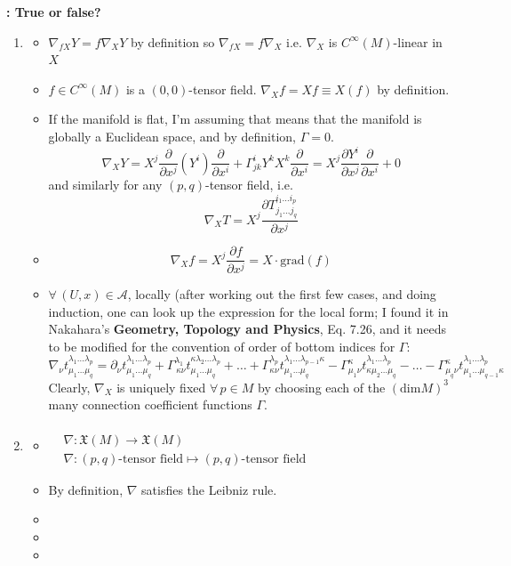 	\textbf{: True or false?}
	
	\begin{enumerate}
		\item[(a)] 
		\begin{itemize}
			\item $\nabla_{fX}Y = f\nabla_XY$ by definition so $\nabla_{fX} = f\nabla_X$ i.e. $\nabla_X$ is $C^{\infty}(M)$-linear in $X$
			\item $f\in C^{\infty}(M)$ is a $(0,0)$-tensor field. $\nabla_Xf = Xf \equiv X(f)$ by definition.
			\item If the manifold is flat, I'm assuming that means that the manifold is globally a Euclidean space, and by definition, $\Gamma=0$.
			\[
			\nabla_X Y = X^j \frac{ \partial }{ \partial x^j} (Y^i) \frac{ \partial }{ \partial x^i } + \Gamma^i_{jk} Y^k X^k \frac{ \partial }{ \partial x^i} = X^j \frac{ \partial Y^i}{ \partial x^j} \frac{ \partial }{ \partial x^i} + 0
			\]
			and similarly for any $(p,q)$-tensor field, i.e.
			\[
			\nabla_X T = X^j \frac{ \partial T^{i_1 \dots i_p}_{ j_1 \dots j_q} }{ \partial x^j}
			\]
			\item \[
			\nabla_X f = X^j \frac{ \partial f}{ \partial x^j} = X\cdot \text{grad}(f)
			\]
			\item $\forall \, (U,x) \in \mathcal{A}$, locally (after working out the first few cases, and doing induction, one can look up the expression for the local form; I found it in Nakahara's \textbf{Geometry, Topology and Physics}, Eq. 7.26, and it needs to be modified for the convention of order of bottom indices for $\Gamma$:
			\[
			\nabla_{\nu} t^{\lambda_1 \dots \lambda_p }_{ \mu_1 \dots \mu_q} = \partial_{\nu} t^{\lambda_1 \dots \lambda_p}_{ \mu_1 \dots \mu_q} + \Gamma^{\lambda_1}_{ \,  \kappa \nu } t^{\kappa \lambda_2 \dots \lambda_p }_{\mu_1 \dots \mu_q} + \dots + \Gamma^{\lambda_p}_{ \kappa \nu } t^{\lambda_1 \dots \lambda_{p-1} \kappa }_{ \mu_1 \dots \mu_q} - \Gamma^{\kappa}_{  \mu_1 \nu} t^{\lambda_1 \dots \lambda_p }_{ \kappa \mu_2 \dots \mu_q} - \dots - \Gamma^{\kappa}_{  \mu_q \nu} t^{\lambda_1 \dots \lambda_p }_{\mu_1 \dots \mu_{q-1} \kappa }
			\]
			Clearly, $\nabla_X$ is uniquely fixed $\forall \, p \in M$ by choosing each of the $(\text{dim}M)^3$ many connection coefficient functions $\Gamma$. 
		\end{itemize}
		\item[(b)] 
		\begin{itemize}
			\item $\begin{aligned} & \quad \\ & \nabla: \mathfrak{X}(M) \to \mathfrak{X}(M) \\
			& \nabla : (p,q)\text{-tensor field} \mapsto (p,q)\text{-tensor field} \end{aligned}$
			\item By definition, $\nabla$ satisfies the Leibniz rule. 
			\item
			\item
			\item
		\end{itemize}
	\end{enumerate}
	
